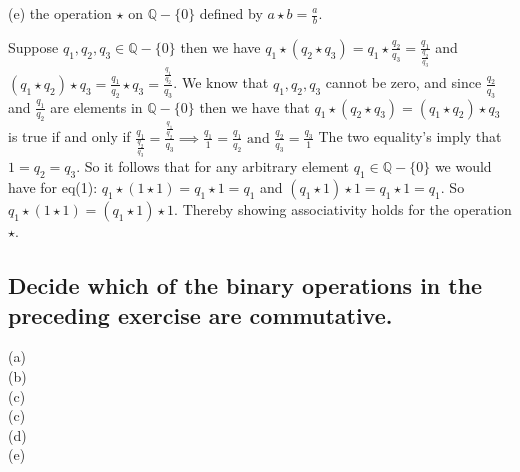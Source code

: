 \documentclass{article}
\begin{document}
 (e) the operation $\star$ on $\mathbb{Q} - \{0\}$ defined by $a\star b = \frac{a}{b}$. 
 
 \noindent Suppose $q_1, q_2, q_3 \in \mathbb{Q} - \{0\}$ then we have $ q_1\star (q_2\star q_3) = q_1 \star \frac{q_2}{q_3} = \frac{q_1}{\frac{q_2}{q_3}}$ and $ (q_1 \star q_2) \star q_3 = \frac{q_1}{q_2} \star q_3 = \frac{\frac{q_1}{q_2}}{q_3}$. We know that $q_1, q_2, q_3$ cannot be zero, and since $\frac{q_2}{q_3}$ and $\frac{q_1}{q_2}$ are elements in $\mathbb{Q} - \{0\}$ then we have that $ q_1\star (q_2\star q_3)  = (q_1\star q_2) \star q_3 $ 
is true if and only if
 $ \frac{q_1}{\frac{q_2}{q_3}}  = \frac{\frac{q_1}{q_2}}{q_3} \implies \frac{q_1}{1} = \frac{q_1}{q_2} \text{ and } \frac{q_2}{q_3} = \frac{q_3}{1}$   The two equality's imply that  $ 1 = q_2 = q_3$. So it follows that for any arbitrary element $q_1\in \mathbb{Q}-\{0\}$ we would have for eq(1): $ q_1 \star (1 \star 1) = q_1\star 1 = q_1$ and $ (q_1\star 1)\star 1 = q_1 \star 1 = q_1$. So $q_1\star (1\star 1) = (q_1\star 1) \star 1$.  Thereby showing associativity holds for the operation $\star$.
 
  \subsection{Decide which of the binary operations in the preceding exercise are commutative.}
 
 (a) \\
 (b) \\
 (c) \\ 
 (c) \\
 (d) \\
 (e) \\
 
\end{document}
